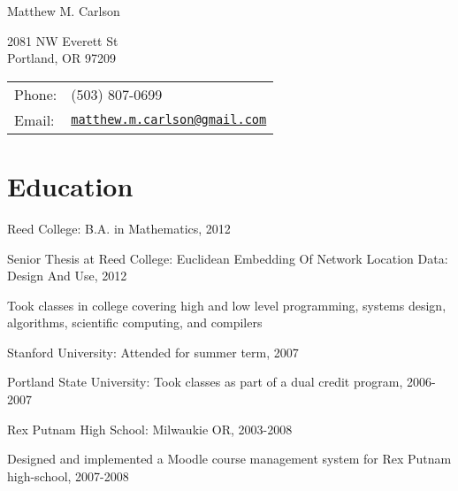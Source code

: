 \documentclass[letterpaper]{article}
\def\name{Matthew M. Carlson}%
\renewenvironment{itemize}{\begin{list}{}{\setlength{\leftmargin}{1.5em}}}{\end{list}}%
\begin{document}
{\huge \name}%
\vspace{0.25in}

\begin{minipage}{0.45\linewidth}
	2081 NW Everett St \\
	Portland, OR 97209
\end{minipage}
\begin{minipage}{0.45\linewidth}
	\begin{tabular}{ll}
	Phone: & (503) 807-0699 \\
	Email: & \href{mailto:matthew.m.carlson@gmail.com}{\tt matthew.m.carlson@gmail.com} \\
  \end{tabular}
\end{minipage}





\section*{Education}

\begin{itemize}
  \item Reed College: B.A. in Mathematics, 2012
	\begin{itemize}
        \item Senior Thesis at Reed College: Euclidean Embedding Of Network Location Data: Design And Use, 2012
        \item Took classes in college covering high and low level programming, systems design, algorithms, scientific computing, and compilers 
	\end{itemize}
  \item Stanford University: Attended for summer term, 2007
  \item Portland State University: Took classes as part of a dual credit program, 2006-2007
  \item Rex Putnam High School: Milwaukie OR, 2003-2008
  \begin{itemize}
    \item Designed and implemented a Moodle course management system for Rex Putnam high-school, 2007-2008
  \end{itemize}
\end{itemize}
\end{document}
